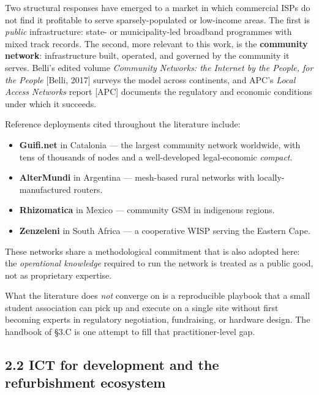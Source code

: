 Two structural responses have emerged to a market in which commercial
ISPs do not find it profitable to serve sparsely-populated or low-income
areas. The first is \emph{public} infrastructure: state- or
municipality-led broadband programmes with mixed track records. The
second, more relevant to this work, is the \textbf{community network}:
infrastructure built, operated, and governed by the community it serves.
Belli's edited volume \emph{Community Networks: the Internet by the
People, for the People} {[}Belli, 2017{]} surveys the model across
continents, and APC's \emph{Local Access Networks} report {[}APC{]}
documents the regulatory and economic conditions under which it
succeeds.

Reference deployments cited throughout the literature include:

\begin{itemize}
\tightlist
\item
  \textbf{Guifi.net} in Catalonia --- the largest community network
  worldwide, with tens of thousands of nodes and a well-developed
  legal-economic \emph{compact}.
\item
  \textbf{AlterMundi} in Argentina --- mesh-based rural networks with
  locally-manufactured routers.
\item
  \textbf{Rhizomatica} in Mexico --- community GSM in indigenous
  regions.
\item
  \textbf{Zenzeleni} in South Africa --- a cooperative WISP serving the
  Eastern Cape.
\end{itemize}

These networks share a methodological commitment that is also adopted
here: the \emph{operational knowledge} required to run the network is
treated as a public good, not as proprietary expertise.

What the literature does \emph{not} converge on is a reproducible
playbook that a small student association can pick up and execute on a
single site without first becoming experts in regulatory negotiation,
fundraising, or hardware design. The handbook of §3.C is one attempt to
fill that practitioner-level gap.

\hypertarget{ict-for-development-and-the-refurbishment-ecosystem}{%
\subsection{2.2 ICT for development and the refurbishment
ecosystem}\label{ict-for-development-and-the-refurbishment-ecosystem}}

